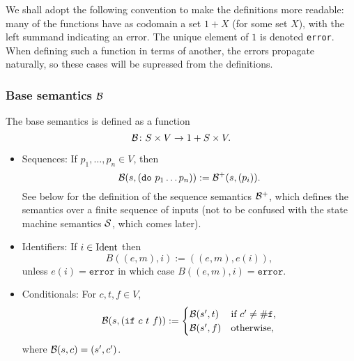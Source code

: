 We shall adopt the following convention to make the definitions more readable:
many of the functions have as codomain a set $1 + X$ (for some set $X$), with
the left summand indicating an error. The unique element of $1$ is denoted
\texttt{error}. When defining such a function in terms of another, the errors
propagate naturally, so these cases will be supressed from the definitions.

\subsubsection{Base semantics $\B$}

The base semantics is defined as a function
\[
\B \colon S \times V \to 1 + S \times V.
\]
\begin{itemize}
\item Sequences: If $p_1, \ldots, p_n \in V$, then
  \[
    \B(s, (\mathtt{do} \ p_1 \ldots p_n)) := \B^+(s, (p_i)).
  \]
  See below for the definition of the sequence semantics $\B^+$, which defines
  the semantics over a finite sequence of inputs (not to be confused with the
  state machine semantics $\S$, which comes later).
\item Identifiers: If $i \in \Ident$ then
  \[
    B((e,m), i) := ((e,m),e(i)),
  \]
  unless $e(i) = \mathtt{error}$ in which case $B((e,m), i) = \mathtt{error}$.
\item Conditionals: For $c,t,f \in V$,
  \[
    \B( s, (\mathtt{if} \ c \ t \ f)) :=
    \begin{cases}
      \B(s', t) & \text{if $c' \neq \mathtt{\#f}$,}\\
      \B(s', f) & \text{otherwise,}
    \end{cases}
  \]
  where $\B(s, c) = (s', c')$.


\end{itemize}
